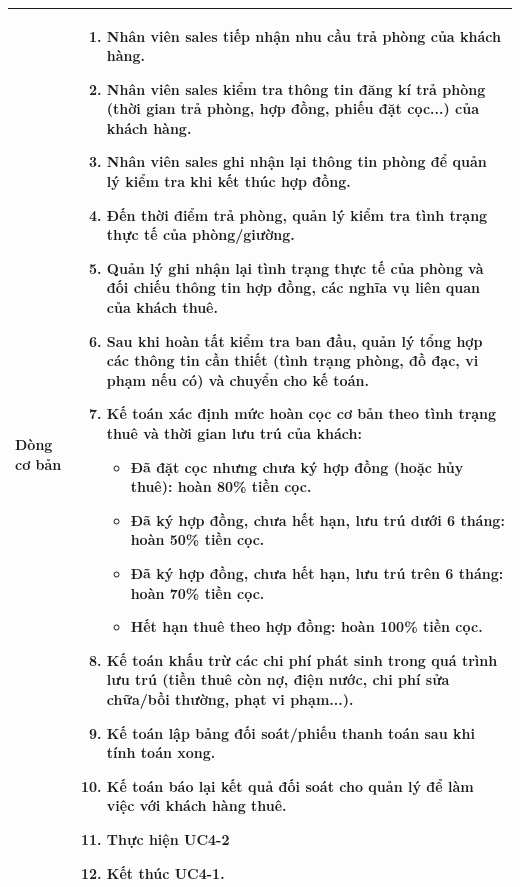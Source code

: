 \begin{table}[H]
\begin{tabularx}{\textwidth}{|>{\centering\arraybackslash\bfseries}m{3.5cm}|X|}
    Dòng cơ bản & 
    \vspace{0.2cm}
    \begin{enumerate}[leftmargin=*, nosep]
        \item Nhân viên sales tiếp nhận nhu cầu trả phòng của khách hàng.
        \item Nhân viên sales kiểm tra thông tin đăng kí trả phòng (thời gian trả phòng, hợp đồng, phiếu đặt cọc...) của khách hàng.
        \item Nhân viên sales ghi nhận lại thông tin phòng để quản lý kiểm tra khi kết thúc hợp đồng.
        \item Đến thời điểm trả phòng, quản lý kiểm tra tình trạng thực tế của phòng/giường.
        \item Quản lý ghi nhận lại tình trạng thực tế của phòng và đối chiếu thông tin hợp đồng, các nghĩa vụ liên quan của khách thuê.
        \item Sau khi hoàn tất kiểm tra ban đầu, quản lý tổng hợp các thông tin cần thiết (tình trạng phòng, đồ đạc, vi phạm nếu có) và chuyển cho kế toán.
        \item Kế toán xác định mức hoàn cọc cơ bản theo tình trạng thuê và thời gian lưu trú của khách:
            \begin{itemize}
                \item Đã đặt cọc nhưng chưa ký hợp đồng (hoặc hủy thuê): hoàn 80\% tiền cọc.
                \item Đã ký hợp đồng, chưa hết hạn, lưu trú dưới 6 tháng: hoàn 50\% tiền cọc.
                \item Đã ký hợp đồng, chưa hết hạn, lưu trú trên 6 tháng: hoàn 70\% tiền cọc.
                \item Hết hạn thuê theo hợp đồng: hoàn 100\% tiền cọc.
            \end{itemize}
        \item Kế toán khấu trừ các chi phí phát sinh trong quá trình lưu trú (tiền thuê còn nợ, điện nước, chi phí sửa chữa/bồi thường, phạt vi phạm...).
        \item Kế toán lập bảng đối soát/phiếu thanh toán sau khi tính toán xong.
        \item Kế toán báo lại kết quả đối soát cho quản lý để làm việc với khách hàng thuê.
        \item Thực hiện \textbf{UC4-2}
        \item Kết thúc \textbf{UC4-1}.
    \end{enumerate} \\ 
    \hline
     

\end{tabularx}
\end{table}
